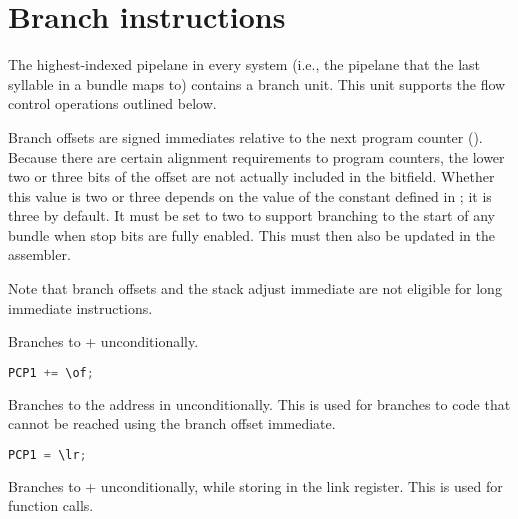 
\section{Branch instructions}

The highest-indexed pipelane in every \rvex{} system (i.e., the pipelane that
the last syllable in a bundle maps to) contains a branch unit. This unit
supports the flow control operations outlined below.

Branch offsets are signed immediates relative to the next program counter
(). Because there are certain alignment requirements to program
counters, the lower two or three bits of the offset are not actually included
in the bitfield. Whether this value is two or three depends on the value of the
 constant defined in ; it
is three by default. It must be set to two to support branching to the start of
any bundle when stop bits are fully enabled. This must then also be updated in
the assembler.

Note that branch offsets and the stack adjust immediate are not eligible for 
long immediate instructions.

Branches to  + \code{\of} unconditionally.

\begin{lstlisting}[numbers=none, basicstyle=\ttfamily\footnotesize, language=C++]
PCP1 += \of;
\end{lstlisting}

Branches to the address in \code{\lr} unconditionally. This is used for branches 
to code that cannot be reached using the branch offset immediate.

\begin{lstlisting}[numbers=none, basicstyle=\ttfamily\footnotesize, language=C++]
PCP1 = \lr;
\end{lstlisting}

Branches to  + \code{\of} unconditionally, while storing  
in the link register. This is used for function calls.

